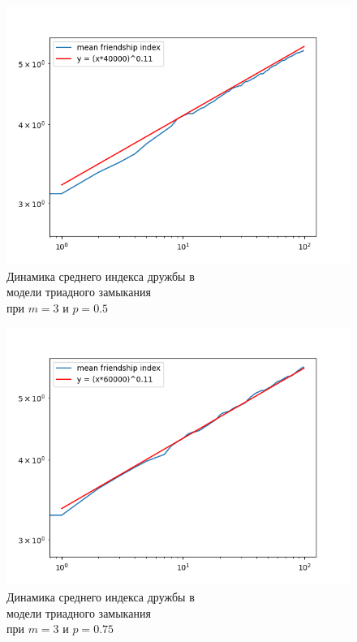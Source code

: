 \documentclass[bachelor, och, diploma]{SCWorks}
\begin{document}
\begin{figure}[!ht]
    \centering
    \includegraphics[scale=0.7]{diploma_results/dynamic_log/triad_mean_beta_3_0.5.png}
    \caption{Динамика среднего индекса дружбы  в\\ модели триадного замыкания\\ при $m=3$ и $p=0.5$}
\end{figure}
\begin{figure}[!ht]
    \centering
    \includegraphics[scale=0.7]{diploma_results/dynamic_log/triad_mean_beta_3_0.75.png}
    \caption{Динамика среднего индекса дружбы  в\\ модели триадного замыкания\\ при $m=3$ и $p=0.75$}
\end{figure}
\end{document}
